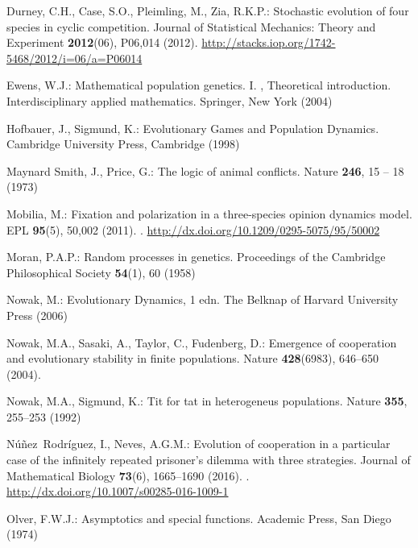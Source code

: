 \documentclass[12pt]{article}
\begin{document}
\begin{thebibliography}{10}
	Durney, C.H., Case, S.O., Pleimling, M., Zia, R.K.P.: Stochastic evolution of
	four species in cyclic competition.
	\newblock Journal of Statistical Mechanics: Theory and Experiment
	\textbf{2012}(06), P06,014 (2012).
	\newblock \urlprefix\url{http://stacks.iop.org/1742-5468/2012/i=06/a=P06014}
	
	Ewens, W.J.: Mathematical population genetics. {I}. , Theoretical introduction.
	\newblock Interdisciplinary applied mathematics. Springer, New York (2004)
	
	Hofbauer, J., Sigmund, K.: Evolutionary Games and Population Dynamics.
	\newblock Cambridge University Press, Cambridge (1998)
	
	{Maynard Smith}, J., Price, G.: The logic of animal conflicts.
	\newblock Nature \textbf{246}, 15 -- 18 (1973)
	
	{Mobilia, M.}: Fixation and polarization in a three-species opinion dynamics
	model.
	\newblock EPL \textbf{95}(5), 50,002 (2011).
	\newblock {}.
	\newblock \urlprefix\url{http://dx.doi.org/10.1209/0295-5075/95/50002}
	
	{Moran}, P.A.P.: {Random processes in genetics}.
	\newblock Proceedings of the Cambridge Philosophical Society \textbf{54}(1), 60
	(1958)
	
	Nowak, M.: Evolutionary Dynamics, 1 edn.
	\newblock The Belknap of Harvard University Press (2006)
	
	Nowak, M.A., Sasaki, A., Taylor, C., Fudenberg, D.: Emergence of cooperation
	and evolutionary stability in finite populations.
	\newblock Nature \textbf{428}(6983), 646--650 (2004).
	\newblock {}
	
	Nowak, M.A., Sigmund, K.: Tit for tat in heterogeneus populations.
	\newblock Nature \textbf{355}, 255--253 (1992)
	
	N{\'u}{\~{n}}ez~Rodr{\'i}guez, I., Neves, A.G.M.: Evolution of cooperation in a
	particular case of the infinitely repeated prisoner's dilemma with three
	strategies.
	\newblock Journal of Mathematical Biology \textbf{73}(6), 1665--1690 (2016).
	\newblock {}.
	\newblock \urlprefix\url{http://dx.doi.org/10.1007/s00285-016-1009-1}
	
	Olver, F.W.J.: Asymptotics and special functions.
	\newblock Academic Press, San Diego (1974)
	

\end{thebibliography}
\end{document}
